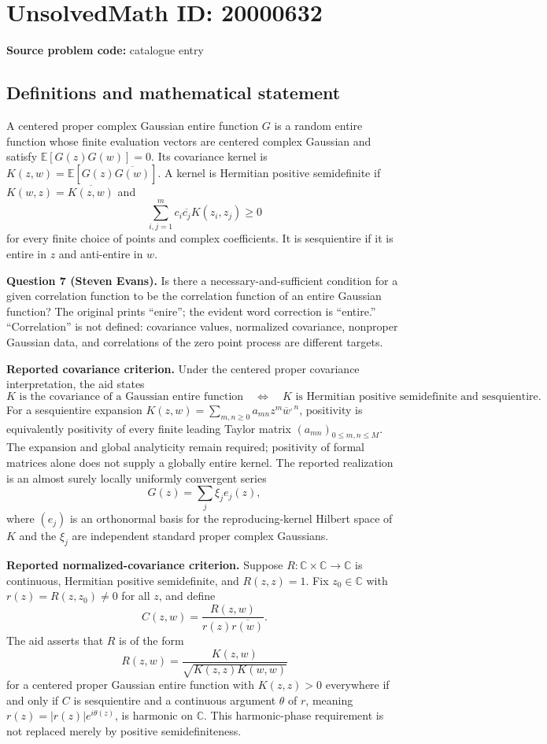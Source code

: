 \documentclass[11pt]{article}
\newcommand{\C}{\mathbb{C}}
\newcommand{\E}{\mathbb{E}}
\begin{document}
\section*{UnsolvedMath ID: 20000632}
\textbf{Source problem code:} catalogue entry
\subsection{Definitions and mathematical statement}
A centered proper complex Gaussian entire function $G$ is a random entire function whose finite evaluation vectors are centered complex Gaussian and satisfy $\E[G(z)G(w)]=0$. Its covariance kernel is $K(z,w)=\E[G(z)\overline{G(w)}]$. A kernel is Hermitian positive semidefinite if $K(w,z)=\overline{K(z,w)}$ and
\[
 \sum_{i,j=1}^m c_i\overline{c_j}K(z_i,z_j)\geq0
\]
for every finite choice of points and complex coefficients. It is sesquientire if it is entire in $z$ and anti-entire in $w$.

\textbf{Question 7 (Steven Evans).} Is there a necessary-and-sufficient condition for a given correlation function to be the correlation function of an entire Gaussian function? The original prints ``enire''; the evident word correction is ``entire.'' ``Correlation'' is not defined: covariance values, normalized covariance, nonproper Gaussian data, and correlations of the zero point process are different targets.

\textbf{Reported covariance criterion.} Under the centered proper covariance interpretation, the aid states
\[
 K\text{ is the covariance of a Gaussian entire function}
 \quad\Longleftrightarrow\quad K\text{ is Hermitian positive semidefinite and sesquientire}.
\]
For a sesquientire expansion $K(z,w)=\sum_{m,n\geq0}a_{mn}z^m\overline w^{,n}$, positivity is equivalently positivity of every finite leading Taylor matrix $(a_{mn})_{0\leq m,n\leq M}$. The expansion and global analyticity remain required; positivity of formal matrices alone does not supply a globally entire kernel. The reported realization is an almost surely locally uniformly convergent series
\[
 G(z)=\sum_j\xi_j e_j(z),
\]
where $(e_j)$ is an orthonormal basis for the reproducing-kernel Hilbert space of $K$ and the $\xi_j$ are independent standard proper complex Gaussians.

\textbf{Reported normalized-covariance criterion.} Suppose $R:\C\times\C\to\C$ is continuous, Hermitian positive semidefinite, and $R(z,z)=1$. Fix $z_0\in\C$ with $r(z)=R(z,z_0)\ne0$ for all $z$, and define
\[
 C(z,w)=\frac{R(z,w)}{r(z)\overline{r(w)}}.
\]
The aid asserts that $R$ is of the form
\[
 R(z,w)=\frac{K(z,w)}{\sqrt{K(z,z)K(w,w)}}
\]
for a centered proper Gaussian entire function with $K(z,z)>0$ everywhere if and only if $C$ is sesquientire and a continuous argument $\theta$ of $r$, meaning $r(z)=|r(z)|e^{i\theta(z)}$, is harmonic on $\C$. This harmonic-phase requirement is not replaced merely by positive semidefiniteness.
\end{document}
